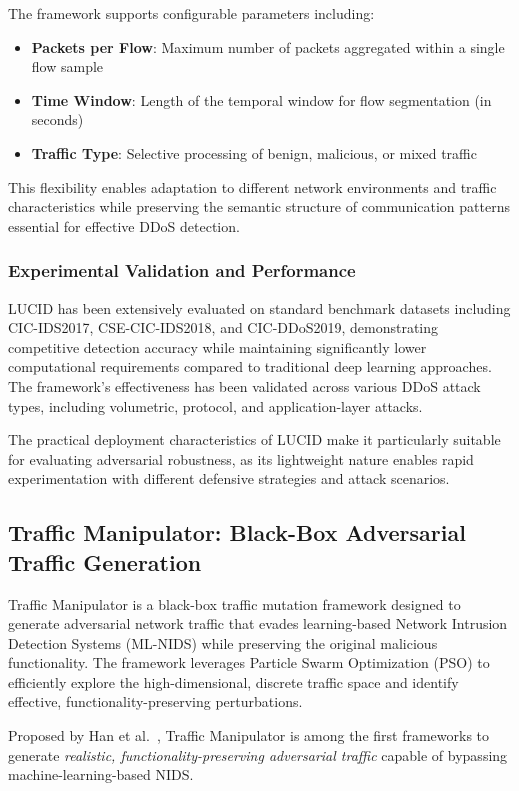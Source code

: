 The framework supports configurable parameters including:
\begin{itemize}
\item \textbf{Packets per Flow}: Maximum number of packets aggregated within a single flow sample
\item \textbf{Time Window}: Length of the temporal window for flow segmentation (in seconds)
\item \textbf{Traffic Type}: Selective processing of benign, malicious, or mixed traffic
\end{itemize}

This flexibility enables adaptation to different network environments and traffic characteristics while preserving the semantic structure of communication patterns essential for effective DDoS detection.

\subsubsection{Experimental Validation and Performance}

LUCID has been extensively evaluated on standard benchmark datasets including CIC-IDS2017, CSE-CIC-IDS2018, and CIC-DDoS2019, demonstrating competitive detection accuracy while maintaining significantly lower computational requirements compared to traditional deep learning approaches. The framework's effectiveness has been validated across various DDoS attack types, including volumetric, protocol, and application-layer attacks.

The practical deployment characteristics of LUCID make it particularly suitable for evaluating adversarial robustness, as its lightweight nature enables rapid experimentation with different defensive strategies and attack scenarios.

\subsection{Traffic Manipulator: Black-Box Adversarial Traffic Generation}
\label{sec:existing_manipulator}
Traffic Manipulator is a black-box traffic mutation framework designed to generate adversarial network traffic that evades learning-based Network Intrusion Detection Systems (ML-NIDS) while preserving the original malicious functionality. The framework leverages Particle Swarm Optimization (PSO) to efficiently explore the high-dimensional, discrete traffic space and identify effective, functionality-preserving perturbations.

Proposed by Han et al.~\cite{han2021evaluating}, Traffic Manipulator is among the first frameworks to generate \emph{realistic, functionality-preserving adversarial traffic} capable of bypassing machine-learning-based NIDS.

